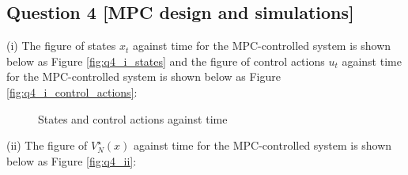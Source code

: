 \documentclass[a4paper,11pt,reqno]{amsart}
\begin{document}
\subsection*{Question 4 [MPC design and simulations]}\label{sec:q4}
(i)
The figure of states $x_t$ against time for the MPC-controlled system is shown below as Figure \ref{fig:q4_i_states} 
and the figure of control actions $u_t$ against time for the MPC-controlled system is shown below as Figure \ref{fig:q4_i_control_actions}:
\begin{figure}[H]
    \centering
    \vspace{-0.35cm}
    \subfigtopskip=2pt
    \subfigbottomskip=2pt
    \subfigcapskip=-5pt
    \quad
    \caption{States and control actions against time}
    \label{fig:q4_i}
\end{figure}
(ii)
The figure of $V^{\star}_N(x)$ against time for the MPC-controlled system is shown below as Figure \ref{fig:q4_ii}:
\end{document}
